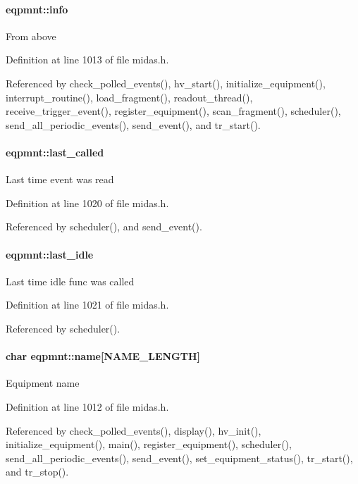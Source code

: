 \paragraph[{info}]{ {\bf eqpmnt::info}}\hfill\label{structeqpmnt_a51afc5b1fc5a6a107cffb9542444b188}
From above 

Definition at line 1013 of file midas.h.

Referenced by check\_\-polled\_\-events(), hv\_\-start(), initialize\_\-equipment(), interrupt\_\-routine(), load\_\-fragment(), readout\_\-thread(), receive\_\-trigger\_\-event(), register\_\-equipment(), scan\_\-fragment(), scheduler(), send\_\-all\_\-periodic\_\-events(), send\_\-event(), and tr\_\-start().
\paragraph[{last\_\-called}]{ {\bf eqpmnt::last\_\-called}}\hfill\label{structeqpmnt_a6bbbd3b1eb8ab1bbc62aa6e07571866a}
Last time event was read 

Definition at line 1020 of file midas.h.

Referenced by scheduler(), and send\_\-event().
\paragraph[{last\_\-idle}]{ {\bf eqpmnt::last\_\-idle}}\hfill\label{structeqpmnt_a8261688ef7d0d371cdf50023cf0447c1}
Last time idle func was called 

Definition at line 1021 of file midas.h.

Referenced by scheduler().
\paragraph[{name}]{\setlength{\rightskip}{0pt plus 5cm}char {\bf eqpmnt::name}\mbox{[}NAME\_\-LENGTH\mbox{]}}\hfill\label{structeqpmnt_a80db04cadcc657d17e5ba6f742d6fbc6}
Equipment name 

Definition at line 1012 of file midas.h.

Referenced by check\_\-polled\_\-events(), display(), hv\_\-init(), initialize\_\-equipment(), main(), register\_\-equipment(), scheduler(), send\_\-all\_\-periodic\_\-events(), send\_\-event(), set\_\-equipment\_\-status(), tr\_\-start(), and tr\_\-stop().
